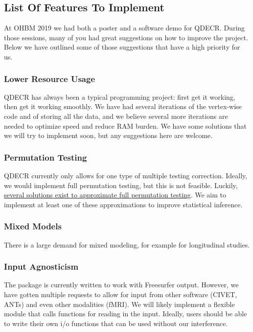 \documentclass[]{article}
\begin{document}
\hypertarget{list-of-features-to-implement}{%
\subsection{List Of Features To
Implement}\label{list-of-features-to-implement}}

At OHBM 2019 we had both a poster and a software demo for QDECR. During
those sessions, many of you had great suggestions on how to improve the
project. Below we have outlined some of those suggestions that have a
high priority for us.

\hypertarget{lower-resource-usage}{%
\subsubsection{Lower Resource Usage}\label{lower-resource-usage}}

QDECR has always been a typical programming project: first get it
working, then get it working smoothly. We have had several iterations of
the vertex-wise code and of storing all the data, and we believe several
more iterations are needed to optimize speed and reduce RAM burden. We
have some solutions that we will try to implement soon, but any
suggestions here are welcome.

\hypertarget{permutation-testing}{%
\subsubsection{Permutation Testing}\label{permutation-testing}}

QDECR currently only allows for one type of multiple testing correction.
Ideally, we would implement full permutation testing, but this is not
feasible. Luckily,
\href{https://www.ncbi.nlm.nih.gov/pmc/articles/PMC5035139/}{several
solutions exist to approximate full permutation testing}. We aim to
implement at least one of these approximations to improve statistical
inference.

\hypertarget{mixed-models}{%
\subsubsection{Mixed Models}\label{mixed-models}}

There is a large demand for mixed modeling, for example for longitudinal
studies.

\hypertarget{input-agnosticism}{%
\subsubsection{Input Agnosticism}\label{input-agnosticism}}

The package is currently written to work with Freesurfer output.
However, we have gotten multiple requests to allow for input from other
software (CIVET, ANTs) and even other modalities (fMRI). We will likely
implement a flexible module that calls functions for reading in the
input. Ideally, users should be able to write their own i/o functions
that can be used without our interference.
\end{document}
